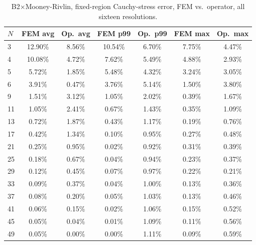 \documentclass[11pt]{article}
\begin{document}
\begin{table}[h]
\centering
\caption{B2$\times$Mooney-Rivlin, fixed-region Cauchy-stress error, FEM
  vs.\ operator, all sixteen resolutions.}
\label{tab:s2-b2mr-b}
\scriptsize
\begin{tabular}{lcccccc}
\toprule
$N$ & FEM avg & Op.\ avg & FEM p99 & Op.\ p99 & FEM max & Op.\ max \\
\midrule
3  & 12.90\% & 8.56\% & 10.54\% & 6.70\% & 7.75\% & 4.47\% \\
4  & 10.08\% & 4.72\% & 7.62\%  & 5.49\% & 4.88\% & 2.93\% \\
5  & 5.72\%  & 1.85\% & 5.48\%  & 4.32\% & 3.24\% & 3.05\% \\
6  & 3.91\%  & 0.47\% & 3.76\%  & 5.14\% & 1.50\% & 3.80\% \\
9  & 1.51\%  & 3.12\% & 1.05\%  & 2.02\% & 0.39\% & 1.67\% \\
11 & 1.05\%  & 2.41\% & 0.67\%  & 1.43\% & 0.35\% & 1.09\% \\
13 & 0.72\%  & 1.87\% & 0.43\%  & 1.17\% & 0.19\% & 0.76\% \\
17 & 0.42\%  & 1.34\% & 0.10\%  & 0.95\% & 0.27\% & 0.48\% \\
21 & 0.25\%  & 0.95\% & 0.02\%  & 0.92\% & 0.31\% & 0.39\% \\
25 & 0.18\%  & 0.67\% & 0.04\%  & 0.94\% & 0.23\% & 0.37\% \\
29 & 0.12\%  & 0.45\% & 0.07\%  & 0.97\% & 0.22\% & 0.21\% \\
33 & 0.09\%  & 0.37\% & 0.04\%  & 1.00\% & 0.13\% & 0.36\% \\
37 & 0.08\%  & 0.20\% & 0.05\%  & 1.03\% & 0.13\% & 0.46\% \\
41 & 0.06\%  & 0.15\% & 0.02\%  & 1.06\% & 0.15\% & 0.52\% \\
45 & 0.05\%  & 0.04\% & 0.01\%  & 1.09\% & 0.11\% & 0.56\% \\
49 & 0.05\%  & 0.00\% & 0.00\%  & 1.11\% & 0.09\% & 0.59\% \\
\bottomrule
\end{tabular}
\end{table}
\end{document}
